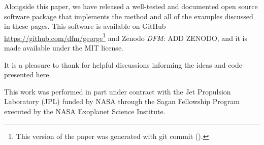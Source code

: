 \documentclass[modern, letterpaper]{aastex61}
\newcommand{\project}[1]{\textsf{#1}}
\newcommand{\todo}[3]{{\color{#2}\emph{#1}: #3}}
\newcommand{\dfmtodo}[1]{\todo{DFM}{red}{#1}}
\begin{document}
Alongside this paper, we have released a well-tested and documented open
source software package that implements the method and all of the examples
discussed in these pages.
This software is available on GitHub
\url{https://github.com/dfm/george}\footnote{This version of the paper was
generated with git commit \texttt{\githash} (\gitdate).} and Zenodo
\dfmtodo{ADD ZENODO}, and it is made available under the MIT license.

\acknowledgments
It is a pleasure to thank
for helpful discussions informing the ideas and code presented here.

This work was performed in part under contract with the Jet Propulsion
Laboratory (JPL) funded by NASA through the Sagan Fellowship Program executed
by the NASA Exoplanet Science Institute.




\software{%
}



\end{document}
